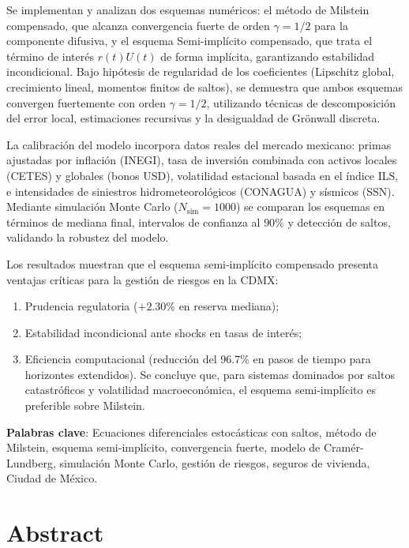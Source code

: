 Se implementan y analizan dos esquemas numéricos: el método de Milstein
compensado, que alcanza convergencia fuerte de orden \(\gamma = 1/2\)
para la componente difusiva, y el esquema Semi-implícito compensado, que
trata el término de interés \(r(t)U(t)\) de forma implícita,
garantizando estabilidad incondicional. Bajo hipótesis de regularidad de
los coeficientes (Lipschitz global, crecimiento lineal, momentos finitos
de saltos), se demuestra que ambos esquemas convergen fuertemente con
orden \(\gamma = 1/2\), utilizando técnicas de descomposición del error
local, estimaciones recursivas y la desigualdad de Grönwall discreta.

La calibración del modelo incorpora datos reales del mercado mexicano:
primas ajustadas por inflación (INEGI), tasa de inversión combinada con
activos locales (CETES) y globales (bonos USD), volatilidad estacional
basada en el índice ILS, e intensidades de siniestros
hidrometeorológicos (CONAGUA) y sísmicos (SSN). Mediante simulación
Monte Carlo (\(N_{\text{sim}} = 1000\)) se comparan los esquemas en
términos de mediana final, intervalos de confianza al \(90\%\) y
detección de saltos, validando la robustez del modelo.

Los resultados muestran que el esquema semi-implícito compensado
presenta ventajas críticas para la gestión de riesgos en la CDMX:

\begin{enumerate}
\def\labelenumi{\roman{enumi}.}
\item
  Prudencia regulatoria (\(+2.30\%\) en reserva mediana);
\item
  Estabilidad incondicional ante shocks en tasas de interés;
\item
  Eficiencia computacional (reducción del 96.7\% en pasos de tiempo para
  horizontes extendidos). Se concluye que, para sistemas dominados por
  saltos catastróficos y volatilidad macroeconómica, el esquema
  semi-implícito es preferible sobre Milstein.
\end{enumerate}

\textbf{Palabras clave}: Ecuaciones diferenciales estocásticas con
saltos, método de Milstein, esquema semi-implícito, convergencia fuerte,
modelo de Cramér-Lundberg, simulación Monte Carlo, gestión de riesgos,
seguros de vivienda, Ciudad de México.

\chapter*{Abstract}

